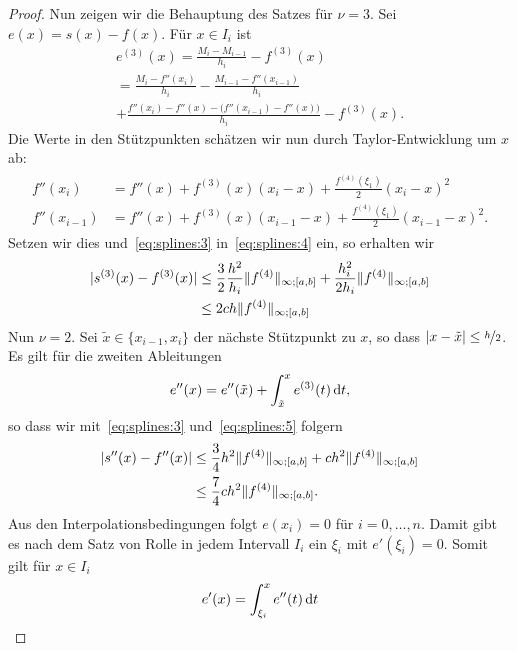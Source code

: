\begin{proof}
  Nun zeigen wir die Behauptung des Satzes für $\nu=3$. Sei
  $e(x) = s(x) - f(x)$. Für $x\in I_i$ ist
  \begin{multline}
    \label{eq:splines:4}
    e^{(3)}(x)
    = \frac{M_i-M_{i-1}}{h_i} - f^{(3)}(x) \\
    = \frac{M_i-f''(x_i)}{h_i} - \frac{M_{i-1}-f''(x_{i-1})}{h_i}
    \\
    + \frac{f''(x_i) - f''(x) -\bigl(f''(x_{i-1}) - f''(x)\bigr)}{h_i}
    - f^{(3)}(x).
  \end{multline}
  Die Werte in den Stützpunkten schätzen wir nun durch
  Taylor-Entwicklung um $x$ ab:
  \begin{gather}
    \begin{split}
    f''(x_i) &= f''(x) + f^{(3)}(x)(x_i-x)
    + \frac{f^{(4)}(\xi_1)}{2} (x_i-x)^2
    \\
    f''(x_{i-1}) &= f''(x) + f^{(3)}(x)(x_{i-1}-x)
    + \frac{f^{(4)}(\xi_1)}{2} (x_{i-1}-x)^2.
    \end{split}
  \end{gather}
  Setzen wir dies und~\eqref{eq:splines:3} in~\eqref{eq:splines:4}
  ein, so erhalten wir
  \begin{align}
    \notag
    \lvert s^{(3)}(x) - f^{(3)}(x)\rvert
    &\le \frac32 \frac{h^2}{h_i} \lVert f^{(4)}\rVert_{\infty;[a,b]}
      + \frac{h_i^2}{2h_i} \lVert f^{(4)}\rVert_{\infty;[a,b]}
    \\
    \label{eq:splines:5}
    &\le 2 c h \lVert f^{(4)}\rVert_{\infty;[a,b]}
  \end{align}
  Nun $\nu=2$. Sei $\tilde x\in\{x_{i-1},x_i\}$ der nächste Stützpunkt zu $x$, so dass $\lvert x-\tilde x\rvert \le \nicefrac h2$. Es gilt für die zweiten Ableitungen
  \begin{gather}
    e''(x) = e''(\tilde x) + \int_{\tilde x}^x e^{(3)}(t)\,\mathrm{d} t,
  \end{gather}
  so dass wir mit~\eqref{eq:splines:3} und~\eqref{eq:splines:5} folgern
  \begin{align}
    \notag
    \lvert s''(x) - f''(x)\rvert &\le \frac34 h^2 \lVert f^{(4)}\rVert_{\infty;[a,b]}
    + ch^2 \lVert f^{(4)}\rVert_{\infty;[a,b]}\\
    \label{eq:splines:6}
    &\le \frac74 ch^2 \lVert f^{(4)}\rVert_{\infty;[a,b]}
    .
  \end{align}
  Aus den Interpolationsbedingungen folgt $e(x_i) = 0$ für
  $i=0,\dots,n$.  Damit gibt es nach dem Satz von Rolle in jedem
  Intervall $I_i$ ein $\xi_i$ mit $e'(\xi_i) = 0$. Somit gilt für $x\in I_i$
  \begin{gather}
    e'(x) = \int_{\xi_i}^x e''(t)\dt

\end{gather}
\end{proof}
